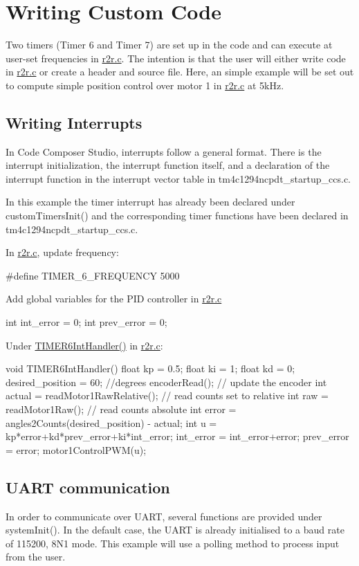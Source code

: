 \hypertarget{index_writingcustomcode}{}\section{Writing Custom Code}\label{index_writingcustomcode}
Two timers (Timer 6 and Timer 7) are set up in the code and can execute at user-\/set frequencies in {\ttfamily \mbox{\hyperlink{r2r_8c}{r2r.\+c}}}. The intention is that the user will either write code in \mbox{\hyperlink{r2r_8c}{r2r.\+c}} or create a header and source file. Here, an simple example will be set out to compute simple position control over motor 1 in \mbox{\hyperlink{r2r_8c}{r2r.\+c}} at 5k\+Hz.\hypertarget{index_writinginterrupts}{}\subsection{Writing Interrupts}\label{index_writinginterrupts}
In Code Composer Studio, interrupts follow a general format. There is the interrupt initialization, the interrupt function itself, and a declaration of the interrupt function in the interrupt vector table in {\ttfamily tm4c1294ncpdt\+\_\+startup\+\_\+ccs.\+c}.

In this example the timer interrupt has already been declared under {\ttfamily custom\+Timers\+Init()} and the corresponding timer functions have been declared in {\ttfamily tm4c1294ncpdt\+\_\+startup\+\_\+ccs.\+c}.

In {\ttfamily \mbox{\hyperlink{r2r_8c}{r2r.\+c}}}, update frequency\+: \begin{DoxyVerb}    #define TIMER_6_FREQUENCY 5000
\end{DoxyVerb}


Add global variables for the P\+ID controller in {\ttfamily \mbox{\hyperlink{r2r_8c}{r2r.\+c}}} \begin{DoxyVerb}int int_error = 0;
int prev_error = 0;
\end{DoxyVerb}


Under {\ttfamily \mbox{\hyperlink{r2r_8c_a57b21594b75d4b2a140a1f9bbb1465e8}{T\+I\+M\+E\+R6\+Int\+Handler()}}} in {\ttfamily \mbox{\hyperlink{r2r_8c}{r2r.\+c}}}\+: \begin{DoxyVerb}void TIMER6IntHandler(){
    float kp = 0.5;
    float ki = 1;
    float kd = 0;
    desired_position = 60; //degrees
    encoderRead(); // update the encoder
    int actual = readMotor1RawRelative(); // read counts set to relative
    int raw = readMotor1Raw(); // read counts absolute
    int error = angles2Counts(desired_position) - actual;
    int u = kp*error+kd*prev_error+ki*int_error;
     int_error = int_error+error;
     prev_error = error;
    motor1ControlPWM(u);
 }  
\end{DoxyVerb}
\hypertarget{index_communication}{}\subsection{U\+A\+R\+T communication}\label{index_communication}
In order to communicate over U\+A\+RT, several functions are provided under {\ttfamily system\+Init()}. In the default case, the U\+A\+RT is already initialised to a baud rate of 115200, 8\+N1 mode. This example will use a polling method to process input from the user.

